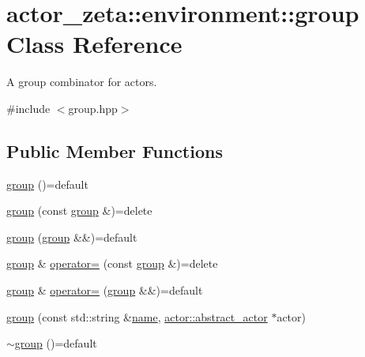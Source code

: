 \hypertarget{classactor__zeta_1_1environment_1_1group}{}\section{actor\+\_\+zeta\+:\+:environment\+:\+:group Class Reference}
\label{classactor__zeta_1_1environment_1_1group}


A group combinator for actors.  




{\ttfamily \#include $<$group.\+hpp$>$}

\subsection*{Public Member Functions}
\begin{DoxyCompactItemize}
\item 
\hyperlink{classactor__zeta_1_1environment_1_1group_a406f197675df3a610f7f1f97d618fd8b}{group} ()=default
\item 
\hyperlink{classactor__zeta_1_1environment_1_1group_a128770ca8d096ecc83261e2fb4be84f4}{group} (const \hyperlink{classactor__zeta_1_1environment_1_1group}{group} \&)=delete
\item 
\hyperlink{classactor__zeta_1_1environment_1_1group_a653e9b9e4ecd7ec5fb859d8bab0af7ef}{group} (\hyperlink{classactor__zeta_1_1environment_1_1group}{group} \&\&)=default
\item 
\hyperlink{classactor__zeta_1_1environment_1_1group}{group} \& \hyperlink{classactor__zeta_1_1environment_1_1group_a86dc74a687759f92f5a977e410fddf0d}{operator=} (const \hyperlink{classactor__zeta_1_1environment_1_1group}{group} \&)=delete
\item 
\hyperlink{classactor__zeta_1_1environment_1_1group}{group} \& \hyperlink{classactor__zeta_1_1environment_1_1group_ae26029271d6d3569a1b56b19666f58a1}{operator=} (\hyperlink{classactor__zeta_1_1environment_1_1group}{group} \&\&)=default
\item 
\hyperlink{classactor__zeta_1_1environment_1_1group_a336f5221201b02bfdcfef91895d613c0}{group} (const std\+::string \&\hyperlink{classactor__zeta_1_1environment_1_1group_a1ad7750f304b0c25e477c91fcc8e3030}{name}, \hyperlink{classactor__zeta_1_1actor_1_1abstract__actor}{actor\+::abstract\+\_\+actor} $\ast$actor)
\item 
\hyperlink{classactor__zeta_1_1environment_1_1group_ad69e978350c72de28c70ad131582bd3e}{$\sim$group} ()=default

\end{DoxyCompactItemize}
